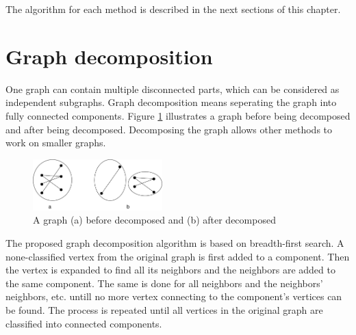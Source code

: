 \documentclass[a4paper]{report}
\begin{document}
	The algorithm for each method is described in the next sections of this chapter.
	

		\section{Graph decomposition}
		One graph can contain multiple disconnected parts, which can be considered as independent subgraphs. Graph decomposition means seperating the graph into fully connected components. Figure \ref{fig:decompose} illustrates a graph before being decomposed and after being decomposed. Decomposing the graph allows other methods to work on smaller graphs.\\
		
		\begin{figure}[h]
			\centering
			\includegraphics[width=50mm,scale=0.5]{figures/DecomposedGraph.pdf}
			\caption{A graph (a) before decomposed and (b) after decomposed}
			\label{fig:decompose}
		\end{figure}
	
%				
		The proposed graph decomposition algorithm is based on breadth-first search. A none-classified vertex from the original graph is first added to a component. Then the vertex is expanded to find all its neighbors and the neighbors are added to the same component. The same is done for all neighbors and the neighbors' neighbors, etc. untill no more vertex connecting to the component's vertices can be found. The process is repeated until all vertices in the original graph are classified into connected components.\\
		
\end{document}
